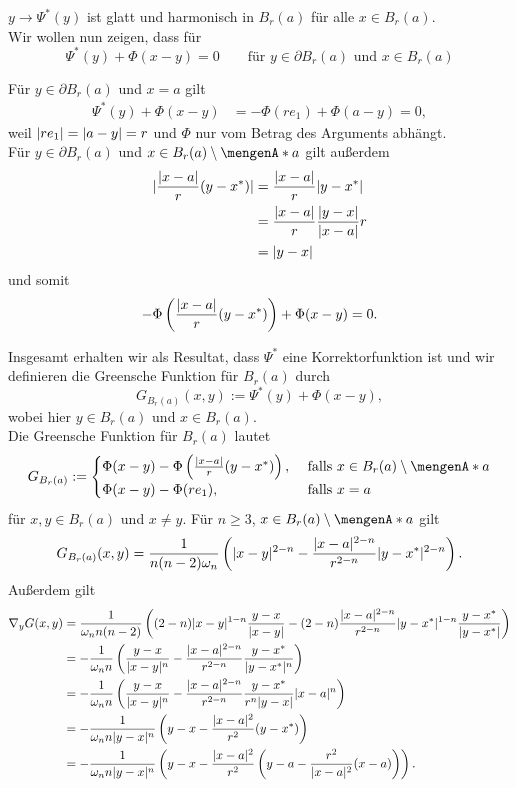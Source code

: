 $y \to \Psi^*(y)$ ist glatt und harmonisch in $B_r(a)$ für alle $x \in B_r(a)$. \\
Wir wollen nun zeigen, dass für \[
	\Psi^*(y) + \Phi(x-y)=0 \qquad \text{für } y \in \partial B_r(a) \text{ und } x \in B_r(a)
\]
\begin{beweis}
	Für $y \in \partial B_r(a)$ und $x = a$ gilt
	\begin{align*}
		\Psi^*(y)+ \Phi(x-y) &= - \Phi(re_1) + \Phi(a-y) = 0,
	\end{align*}
	weil $\lvert re_1\rvert = \lvert a-y\rvert = r$ und $\Phi$ nur vom Betrag des Arguments abhängt. \\
	Für $y \in \partial B_r(a)$ und $x \in B_r(a) \setminus \set{a}$ gilt außerdem
	\begin{align*}
		\lvert\frac{\lvert x-a\rvert}{r}(y-x^*)\rvert &= \frac{\lvert x-a\rvert}{r} \lvert y-x^*\rvert \\
		&= \frac{\lvert x-a\rvert}{r} \frac{\lvert y-x\rvert}{\lvert x-a\rvert}r  \\ 
		&= \lvert y-x\rvert
	\end{align*}
	und somit
	\[
		- \Phi \left( \frac{\lvert x-a\rvert}{r}(y-x^*) \right) + \Phi(x-y)= 0.
	\]
	\end{beweis}
	Insgesamt erhalten wir als Resultat, dass $\Psi^*$ eine Korrektorfunktion ist und wir definieren die Greensche Funktion für $B_r(a)$ durch
	\[
		G_{B_r(a)}(x,y) := \Psi^*(y) + \Phi(x-y),
	\]
	wobei hier $y \in B_r(a)$ und $x \in B_r(a)$. \\
	Die Greensche Funktion für $B_r(a)$ lautet
	\[
		G_{B_r(a)} := \begin{cases}
			 \Phi(x-y)- \Phi \left( \frac{\abs{x-a}}{r}(y-x^*) \right) , &\text{ falls }x \in B_r(a) \setminus \set{a}\\
			 \Phi(x-y)- \Phi(re_1) , &\text{ falls }x =a
		\end{cases}
	\]
	für $x,y \in B_r(a)$ und $x \neq y$. Für $n \geq 3$, $x \in  B_r(a) \setminus \set{a}$ gilt
	\[
		G_{B_r(a)}(x,y) = \frac{1}{n (n-2) \omega_n} \left( \lvert x-y\rvert^{2-n} - \frac{ \lvert x-a\rvert^{2-n}}{r^{2-n}} \lvert y - x^*\rvert^{2-n} \right).
	\]
	Außerdem gilt
	\begin{align*}
		 \nabla_y G(x,y) &= \frac{1}{\omega_n n(n-2)} \left( (2-n) \lvert x-y\rvert^{1-n} \frac{y-x}{\lvert x-y\rvert} 
		 - (2-n) \frac{\lvert x-a\rvert^{2-n}}{r ^{2-n}} \lvert y-x^*\rvert^{1-n} \frac{y-x^*}{\lvert y-x^*\rvert} \right) \\
		 &= - \frac{1}{\omega_nn} \left( \frac{y-x}{\lvert x-y\rvert^n} - \frac{\lvert x-a\rvert^{2-n}}{r^{2-n}} \frac{y- x^*}{\lvert y- x^*\rvert^n} \right) \\
		 &= - \frac{1}{\omega_nn} \left( \frac{y-x}{\lvert x-y\rvert^n} - \frac{\lvert x-a\rvert^{2-n}}{r^{2-n}} \frac{y-x^*}{r^n \lvert y-x\rvert} \lvert x-a\rvert^n \right) \\
		 &= - \frac{1}{\omega_n n \lvert y-x\rvert^n} \left( y-x - \frac{\lvert x-a\rvert^2}{r^2}(y-x^*) \right) \\
		 &= - \frac{1}{\omega_n n \lvert y-x\rvert^n} \left( y-x - \frac{\lvert x-a\rvert^2}{r^2} \left( y - a - \frac{r^2}{\lvert x-a\rvert^2}(x-a) \right) \right).
	\end{align*}
